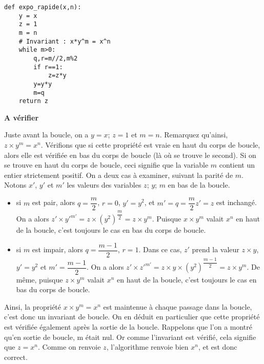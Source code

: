 \begin{lstlisting}
def expo_rapide(x,n):
    y = x
    z = 1
    m = n
    # Invariant : x*y^m = x^n
    while m>0:
        q,r=m//2,m%2
        if r==1:
            z=z*y
        y=y*y
        m=q
    return z
\end{lstlisting}

\ifprof
\begin{corrige}
\textbf{A vérifier}

Juste avant la boucle, on a $y = x$; $z = 1$ et $m = n$. Remarquez qu’ainsi, $z\times y^m = x^n$. Vérifions que si cette propriété est vraie en haut du corps de boucle, alors elle est vérifiée en bas du corps de boucle
(là où se trouve le second). Si on se trouve en haut du corps de boucle, ceci signifie que la variable $m$ contient un entier
strictement positif. On a deux cas à examiner, suivant la parité de $m$. Notons $x'$, $y'$ et $m'$ les valeurs des variables
$z$; $y$; $m$ en bas de la boucle.
\begin{itemize}
\item si $m$ est pair, alors $q = \dfrac{m}{2}$, $r=0$, $y'=y^2$, et $m'=q=\dfrac{m}{2}z'=z$ est inchangé. On a alors
$z'\times y'^{m'}=z\times \left(y^2\right)^{\dfrac{m}{2}} = z\times y^m$. Puisque $x\times y^m$ valait $x^n$ en haut de la boucle, c’est toujours le cas en bas du corps de boucle.
\item si $m$ est impair, alors $q=\dfrac{m-1}{2}$, $r=1$. Dans ce cas, $z'$ prend la valeur $z\times y$, $y'=y^2$ et 
$m'=\dfrac{m-1}{2}$. On a alors $z' \times z'^{m'} = z\times y \times \left(y^2\right)^{\dfrac{m-1}{2}}  = z\times y^m$.
De même, puisque $z\times y^m$ valait $x^n$ en haut de la boucle, c’est toujours le cas en bas du corps de boucle.
\end{itemize}
Ainsi, la propriété $x\times y^m = x^n$ est maintenue à chaque passage dans la boucle, c’est donc un invariant de boucle.
On en déduit en particulier que cette propriété est vérifiée également après la sortie de la boucle. Rappelons que l’on
a montré qu’en sortie de boucle, m était nul. Or comme l’invariant est vérifié, cela signifie que $z=x^n$. Comme on renvoie $z$, l'algorithme renvoie bien $x^n$, et est donc correct.
\end{corrige}
\else
\fi